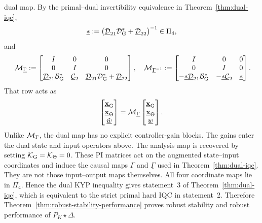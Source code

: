 dual map. By the primal--dual invertibility equivalence in
Theorem~\ref{thm:dual-iqc},
\begin{equation*}
\underline{\mathcal{\Lambda}}
:=\bigl(\underline{\mathcal{D}}_{21}\mathcal{D}_{{\mathrm{G}}}^*
+\underline{\mathcal{D}}_{22}\bigr)^{-1}\in\Pi_4,
\end{equation*}
and
\begin{equation*}\
\mathcal{M}_{\underline\Gamma}
:=\begin{bmatrix}
I&0&0\\
0&I&0\\
\underline{\mathcal{D}}_{21}\mathcal{B}_{{\mathrm{G}}}^*
&\underline{\mathcal{C}}_2
&\underline{\mathcal{D}}_{21}\mathcal{D}_{{\mathrm{G}}}^*+\underline{\mathcal{D}}_{22}
\end{bmatrix},\quad
\mathcal{M}_{\underline\Gamma^{-1}}
:=\begin{bmatrix}
I&0&0\\
0&I&0\\
-\underline{\mathcal{\Lambda}}\underline{\mathcal{D}}_{21}\mathcal{B}_{{\mathrm{G}}}^*
&-\underline{\mathcal{\Lambda}}\underline{\mathcal{C}}_2
&\underline{\mathcal{\Lambda}}
\end{bmatrix}.
\end{equation*}
That row acts as
\begin{equation*}
\begin{bmatrix}\underline{\mathbf{x}}_{{\mathrm{G}}}\\\underline{\mathbf{x}}_\Theta\\
\tilde{\underline w}\end{bmatrix}
=\mathcal{M}_{\underline\Gamma}
\begin{bmatrix}\underline{\mathbf{x}}_{{\mathrm{G}}}\\\underline{\mathbf{x}}_\Theta\\\underline w\end{bmatrix}.
\end{equation*}
Unlike $\mathcal{M}_\Gamma$, the dual map has no explicit controller-gain blocks.
The gains enter the dual state and input operators above. The analysis map
is recovered by setting
$\mathcal{K}_{{\mathrm{G}}}=\mathcal{K}_\Theta=0$. These PI matrices act on the augmented
state--input coordinates and induce the causal maps $\Gamma$ and
$\underline\Gamma$ used in Theorem~\ref{thm:dual-iqc}. They are not those
input--output maps themselves. All four coordinate maps lie in $\Pi_4$.
Hence the dual KYP
inequality gives statement~3 of Theorem~\ref{thm:dual-iqc}, which is
equivalent to the strict primal hard IQC in statement~2. Therefore
Theorem~\ref{thm:robust-stability-performance} proves robust stability and
robust performance of $P_K\star\Delta$.

